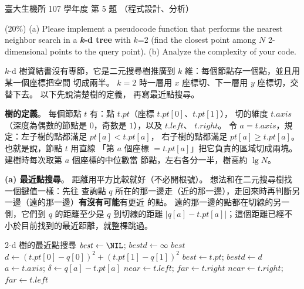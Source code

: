\begin{pastexam}[label={px:ntu-107-bime-ds-05}]{臺大生機所 107 學年度 第 5 題}
（程式設計、分析）

(20\%) (a) Please implement a pseudocode function that performs the nearest neighbor search in a
\textbf{\textit{k}-d tree} with $k$=2 (find the closest point among $N$ 2-dimensional points to the
query point). (b) Analyze the complexity of your code.
\end{pastexam}

\begin{pastsoln}
$k$-d 樹資結書沒有專節，它是二元搜尋樹推廣到 $k$ 維：每個節點存一個點，並且用某一個座標把空間
切成兩半。 $k = 2$ 時一層用 $x$ 座標切、下一層用 $y$ 座標切，交替下去。 以下先說清楚樹的定義，
再寫最近點搜尋。

\textbf{樹的定義}。 每個節點 $t$ 有：點 $t.\mathit{pt}$（座標 $t.\mathit{pt}[0]$、$t.\mathit{pt}[1]$），
切的維度 $t.\mathit{axis}$（深度為偶數的節點是 $0$，奇數是 $1$），以及 $t.\mathit{left}$、
$t.\mathit{right}$。 令 $a = t.\mathit{axis}$，規定：左子樹的點都滿足 $\mathit{pt}[a] < t.\mathit{pt}[a]$，
右子樹的點都滿足 $\mathit{pt}[a] \ge t.\mathit{pt}[a]$。 也就是說，節點 $t$ 用直線
「第 $a$ 個座標 $= t.\mathit{pt}[a]$」把它負責的區域切成兩塊。 建樹時每次取第 $a$ 個座標的中位數當
節點，左右各分一半，樹高約 $\lg N$。

\textbf{(a) 最近點搜尋}。 距離用平方比較就好（不必開根號）。 想法和在二元搜尋樹找一個鍵值一樣：先往
查詢點 $q$ 所在的那一邊走（近的那一邊），走回來時再判斷另一邊（遠的那一邊）\textbf{有沒有可能}有更近
的點。 遠的那一邊的點都在切線的另一側，它們到 $q$ 的距離至少是 $q$ 到切線的距離
$|q[a] - t.\mathit{pt}[a]|$；這個距離已經不小於目前找到的最近距離，就整棵跳過。

\begin{pseudo}{2-d 樹的最近點搜尋}
    \State $\mathit{best} \gets \NIL$; $\mathit{bestd} \gets \infty$ 
    \State {}
    \State \Return $\mathit{best}$
\EndFunction
\Statex
{}
        \State \Return
    \EndIf
    \State $d \gets (t.\mathit{pt}[0] - q[0])^2 + (t.\mathit{pt}[1] - q[1])^2$
        \State $\mathit{best} \gets t.\mathit{pt}$; $\mathit{bestd} \gets d$
    \EndIf
    \State $a \gets t.\mathit{axis}$; $\delta \gets q[a] - t.\mathit{pt}[a]$ 
        \State $\mathit{near} \gets t.\mathit{left}$; $\mathit{far} \gets t.\mathit{right}$
    \Else
        \State $\mathit{near} \gets t.\mathit{right}$; $\mathit{far} \gets t.\mathit{left}$
    \EndIf
    \State {} 
     
        \State {}
    \EndIf
\EndProcedure
\end{pseudo}


\end{pastsoln}
